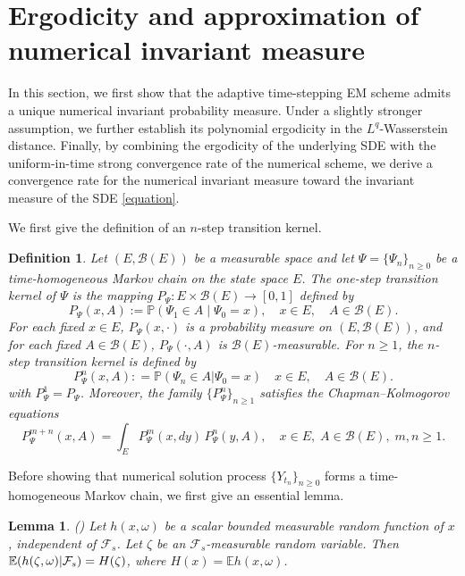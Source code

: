 \documentclass[preprint,12pt,compress]{elsarticle}
\newtheorem{definition}[theorem]{Definition} %
\newtheorem{lemma}[theorem]{Lemma}%
\begin{document}
\section{Ergodicity and approximation of numerical invariant measure}  \label{sec8}
In this section, we first show that the adaptive time-stepping EM scheme  admits a unique numerical invariant probability measure. Under a slightly stronger assumption, we further establish its polynomial ergodicity in the $L^q$-Wasserstein distance. Finally, by combining the ergodicity of the underlying SDE with the uniform-in-time strong convergence rate of the numerical scheme, we derive a convergence rate for the numerical invariant measure toward the invariant measure of the SDE \eqref{equation}.

We first give the definition of an $n$-step transition kernel.

\begin{definition}
Let $(E, \mathcal{B}(E))$ be a measurable space and let $\Psi=\{\Psi_n\}_{n\ge0}$ be a time-homogeneous Markov chain on the state space $E$. The one-step transition kernel of $\Psi$ is the mapping $P_\Psi : E \times \mathcal{B}(E) \to [0,1]$ defined by
\begin{equation*}
	P_\Psi(x,A):= \mathbb P(\Psi_1 \in A \mid \Psi_0 = x),
	\quad x \in E, \quad A\in \mathcal{B}(E).
\end{equation*}
For each fixed $x\in E$, $P_\Psi(x,\cdot)$ is a probability measure on $(E,\mathcal{B}(E))$, and for each fixed $A \in \mathcal{B}(E)$, $P_\Psi(\cdot,A)$ is $\mathcal{B}(E)$-measurable.
For $n \ge 1$, the $n$-step transition kernel is defined by
	\begin{equation*}
		{P}_\Psi ^n(x,A): = \mathbb{P}({\Psi _{n}} \in A|{\Psi _0} = x) \quad x \in E, \quad A \in \mathcal{B}(E).
	\end{equation*}
	with $P_\Psi^1=P_\Psi$. 
Moreover, the family $\{P_\Psi^n\}_{n\ge1}$ satisfies the Chapman--Kolmogorov equations
\begin{equation*}
	P_\Psi^{m+n}(x,A) = \int_E P_\Psi^m(x,dy) \, P_\Psi^n(y,A), 
	\quad x\in E, \; A\in \mathcal{B}(E), \; m,n\ge 1.
\end{equation*}
\end{definition}

Before showing that numerical solution process
${\{ {Y_{{t_n}}}\} _{n \ge 0}}$	forms a time-homogeneous Markov chain, we first give an essential lemma.

\begin{lemma} (\cite[Lemma 1.9.2, p. 87]{mao2008stochastic})
Let $h(x, \omega)$ be a scalar bounded measurable random function of $x$, independent of $\mathcal{F}_s$. Let $\zeta $ be an $\mathcal{F}_s$-measurable random variable. Then $\mathbb{E}(h(\zeta ,\omega )|{{\cal F}_s}) = H(\zeta)$, where $H(x) = \mathbb{E}h(x, \omega)$.
\end{lemma}
\end{document}

